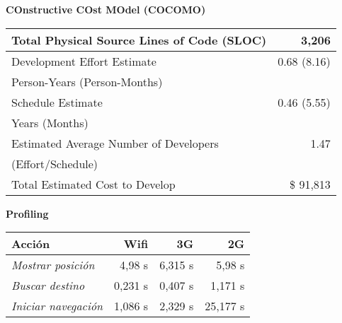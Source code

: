 \begin{slide}
  \begin{block}{\textbf{COnstructive COst MOdel (COCOMO)}}
\begin{table}[h]
  \centering
  \begin{tabular}{|l|r|}
    \hline
    Total Physical Source Lines of Code (SLOC) & 3,206 \\
    \hline
    Development Effort Estimate & 0.68 (8.16) \\
    Person-Years (Person-Months) & \\
    \hline
    Schedule Estimate & 0.46 (5.55) \\
    Years (Months) & \\
    \hline
    Estimated Average Number of Developers & 1.47 \\
    (Effort/Schedule) & \\
    \hline
    Total Estimated Cost to Develop & \$ 91,813 \\
    \hline
  \end{tabular}
\end{table}
  \end{block}
\end{slide}

\begin{slide}
  \begin{block}{\textbf{Profiling}}
\begin{table}[h]
  \centering
  \begin{tabular}{|l|r|r|r|}
    \hline
    \textbf{Acción} & \textbf{Wifi} & \textbf{3G} & \textbf{2G} \\
    \hline
    \emph{Mostrar posición}   &  4,98 s & 6,315 s &   5,98 s \\
    \hline
    \emph{Buscar destino}     & 0,231 s & 0,407 s &  1,171 s \\
    \hline
    \emph{Iniciar navegación} & 1,086 s & 2,329 s & 25,177 s \\
    \hline
  \end{tabular}
\end{table}
  \end{block}
\end{slide}

